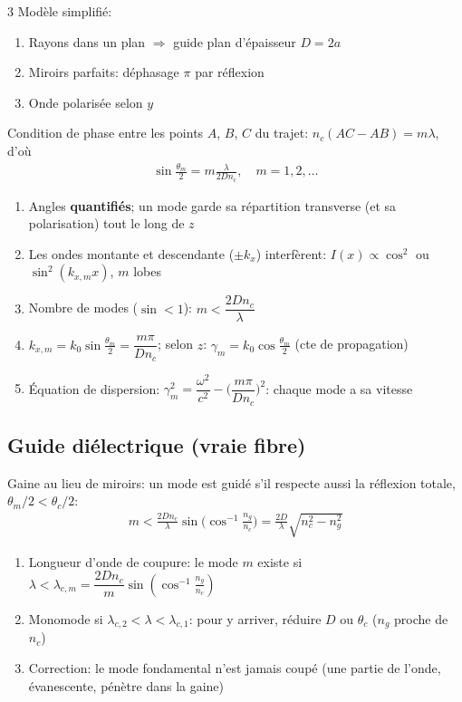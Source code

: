 \documentclass[12pt, a4paper]{article}
\begin{document}
\begin{multicols*}{3}
	Modèle simplifié:
	\begin{enumerate}[\roman*.]
		\item Rayons dans un plan $\Rightarrow$ guide plan d'épaisseur $D=2a$
		\item Miroirs parfaits: déphasage $\pi$ par réflexion
		\item Onde polarisée selon $y$
	\end{enumerate}

	\colbreak
	Condition de phase entre les points $A$, $B$, $C$ du trajet: $n_c(AC-AB)=m\lambda$, d'où
	\begin{gather*}
		\sin\frac{\theta_m}{2}=m\frac{\lambda}{2Dn_c},\quad m=1,2,\ldots
	\end{gather*}
	\begin{enumerate}[\roman*.]
		\item Angles \textbf{quantifiés}; un mode garde sa répartition transverse (et sa polarisation) tout le long de $z$
		\item Les ondes montante et descendante ($\pm k_x$) interfèrent: $I(x)\propto\cos^2$ ou $\sin^2(k_{x,m}x)$, $m$ lobes
		\item Nombre de modes ($\sin<1$): $m<\dfrac{2Dn_c}{\lambda}$
		\item $k_{x,m}=k_0\sin\frac{\theta_m}{2}=\dfrac{m\pi}{Dn_c}$; selon $z$: $\gamma_m=k_0\cos\frac{\theta_m}{2}$ (cte de propagation)
		\item Équation de dispersion: $\gamma_m^2=\dfrac{\omega^2}{c^2}-\Big(\dfrac{m\pi}{Dn_c}\Big)^2$: chaque mode a sa vitesse
	\end{enumerate}

	\subsection{Guide diélectrique (vraie fibre)}
	Gaine au lieu de miroirs: un mode est guidé s'il respecte aussi la réflexion totale, $\theta_m/2<\theta_c/2$:
	\begin{gather*}
		m<\frac{2Dn_c}{\lambda}\sin\Big(\cos^{-1}\frac{n_g}{n_c}\Big)=\frac{2D}{\lambda}\sqrt{n_c^2-n_g^2}
	\end{gather*}
	\begin{enumerate}[\roman*.]
		\item Longueur d'onde de coupure: le mode $m$ existe si $\lambda<\lambda_{c,m}=\dfrac{2Dn_c}{m}\sin(\cos^{-1}\frac{n_g}{n_c})$
		\item Monomode si $\lambda_{c,2}<\lambda<\lambda_{c,1}$: pour y arriver, réduire $D$ ou $\theta_c$ ($n_g$ proche de $n_c$)
		\item Correction: le mode fondamental n'est jamais coupé (une partie de l'onde, évanescente, pénètre dans la gaine)
	\end{enumerate}


\end{multicols*}
\end{document}
